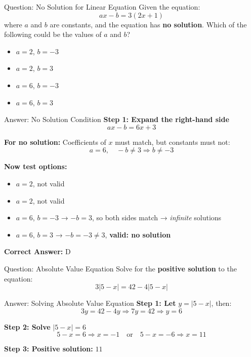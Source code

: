\documentclass{beamer}
\begin{document}
\begin{frame}{Question: No Solution for Linear Equation}
    Given the equation:
    \[
    ax - b = 3(2x + 1)
    \]
    where \(a\) and \(b\) are constants, and the equation has \textbf{no solution}.  
    Which of the following could be the values of \(a\) and \(b\)?

    \vspace{1em}
    \begin{itemize}
        \item[\textbf{A.}] \(a = 2\), \(b = -3\)
        \item[\textbf{B.}] \(a = 2\), \(b = 3\)
        \item[\textbf{C.}] \(a = 6\), \(b = -3\)
        \item[\textbf{D.}] \(a = 6\), \(b = 3\)
    \end{itemize}
\end{frame}
\begin{frame}{Answer: No Solution Condition}
    \textbf{Step 1: Expand the right-hand side}
    \[
    ax - b = 6x + 3
    \]

    \textbf{For no solution:}  
    Coefficients of \(x\) must match, but constants must not:
    \[
    a = 6, \quad -b \neq 3 \Rightarrow b \neq -3
    \]

    \textbf{Now test options:}
    \begin{itemize}
        \item[\textbf{A.}] \(a = 2\), not valid
        \item[\textbf{B.}] \(a = 2\), not valid
        \item[\textbf{C.}] \(a = 6\), \(b = -3\) → \(-b = 3\), so both sides match → \emph{infinite} solutions
        \item[\textbf{D.}] \(a = 6\), \(b = 3\) → \(-b = -3 \neq 3\), \textbf{valid: no solution}
    \end{itemize}

    \vspace{0.5em}
    \textbf{Correct Answer:} \(\boxed{\text{D}}\)
\end{frame}
\begin{frame}{Question: Absolute Value Equation}
    Solve for the \textbf{positive solution} to the equation:
    \[
    3|5 - x| = 42 - 4|5 - x|
    \]
\end{frame}
\begin{frame}{Answer: Solving Absolute Value Equation}
    \textbf{Step 1: Let } \(y = |5 - x|\), then:
    \[
    3y = 42 - 4y
    \Rightarrow 7y = 42 \Rightarrow y = 6
    \]

    \textbf{Step 2: Solve } \(|5 - x| = 6\)
    \[
    5 - x = 6 \Rightarrow x = -1 \quad \text{or} \quad 5 - x = -6 \Rightarrow x = 11
    \]

    \textbf{Step 3: Positive solution:} \(\boxed{11}\)
\end{frame}
\end{document}
